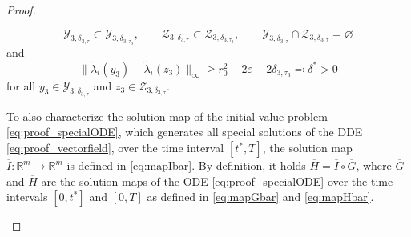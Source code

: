 \documentclass[10pt]{article}
\numberwithin{equation}{section}
\newcommand{\eps}{\varepsilon}
\newcommand\normm[1]{\big\lVert#1\big\lVert}
\begin{document}
\begin{proof}
\begin{enumerate}
			\begin{equation*}
				\mathcal{Y}_{3,\delta_{3,\tau}}\subset \mathcal{Y}_{3,\delta_{3,\tau_3}}, \qquad  \mathcal{Z}_{3,\delta_{3,\tau}}\subset\mathcal{Z}_{3,\delta_{3,\tau_3}}, \qquad \mathcal{Y}_{3,\delta_{3,\tau}} \cap	\mathcal{Z}_{3,\delta_{3,\tau}} = \varnothing
			\end{equation*} 
			and 
			\begin{equation*}
				\normm{\tilde{\lambda}_i(y_3)-\tilde{\lambda}_i(z_3)}_\infty \geq 	r_0^2-2\eps- 2\delta_{3,\tau_3} \eqqcolon \delta^\ast > 0
			\end{equation*}
			for all $y_3 \in \mathcal{Y}_{3,\delta_{3,\tau}}$ and $z_3 \in \mathcal{Z}_{3,\delta_{3,\tau}}$. 
			
			To also characterize the solution map of the initial value problem \eqref{eq:proof_specialODE}, which generates all special solutions of the DDE \eqref{eq:proof_vectorfield}, over the time interval $[t^\ast,T]$, the solution map $\overline{I}:\mathbb{R}^m\rightarrow\mathbb{R}^m$ is defined in \eqref{eq:mapIbar}. By definition, it holds $\overline{H} = \overline{I} \circ \overline{G}$, where $\overline{G}$ and $\overline{H}$ are the solution maps of the ODE \eqref{eq:proof_specialODE} over the time intervals $[0,t^\ast]$ and $[0,T]$ as defined in \eqref{eq:mapGbar} and \eqref{eq:mapHbar}.
			

\end{enumerate}
\end{proof}
\end{document}
